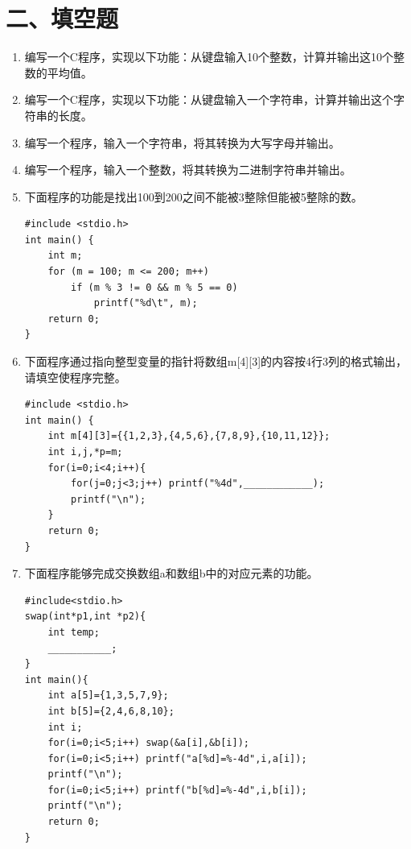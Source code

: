 \documentclass[a4paper,12pt]{article}
\begin{document}
\section*{二、填空题}

\begin{enumerate}
	\item 编写一个C程序，实现以下功能：从键盘输入10个整数，计算并输出这10个整数的平均值。
	      \vspace{0.3cm}

	\item 编写一个C程序，实现以下功能：从键盘输入一个字符串，计算并输出这个字符串的长度。
	      \vspace{0.3cm}

	\item 编写一个程序，输入一个字符串，将其转换为大写字母并输出。
	      \vspace{0.3cm}

	\item 编写一个程序，输入一个整数，将其转换为二进制字符串并输出。
	      \vspace{0.3cm}

	\item 下面程序的功能是找出100到200之间不能被3整除但能被5整除的数。
	      \begin{verbatim}
#include <stdio.h>
int main() {
    int m;
    for (m = 100; m <= 200; m++)
        if (m % 3 != 0 && m % 5 == 0)
            printf("%d\t", m);
    return 0;
}
    \end{verbatim}
	      \vspace{0.3cm}

	\item 下面程序通过指向整型变量的指针将数组m[4][3]的内容按4行3列的格式输出，请填空使程序完整。
	      \begin{verbatim}
#include <stdio.h>
int main() {
    int m[4][3]={{1,2,3},{4,5,6},{7,8,9},{10,11,12}};
    int i,j,*p=m;
    for(i=0;i<4;i++){
        for(j=0;j<3;j++) printf("%4d",____________);
        printf("\n");
    }
    return 0;
}
    \end{verbatim}
	      \vspace{0.3cm}

	\item 下面程序能够完成交换数组a和数组b中的对应元素的功能。
	      \begin{verbatim}
#include<stdio.h>
swap(int*p1,int *p2){
    int temp;
    ___________;
}
int main(){
    int a[5]={1,3,5,7,9};
    int b[5]={2,4,6,8,10};
    int i;
    for(i=0;i<5;i++) swap(&a[i],&b[i]);
    for(i=0;i<5;i++) printf("a[%d]=%-4d",i,a[i]);
    printf("\n");
    for(i=0;i<5;i++) printf("b[%d]=%-4d",i,b[i]);
    printf("\n");
    return 0;
}
    \end{verbatim}
	      \vspace{0.3cm}


\end{enumerate}
\end{document}
